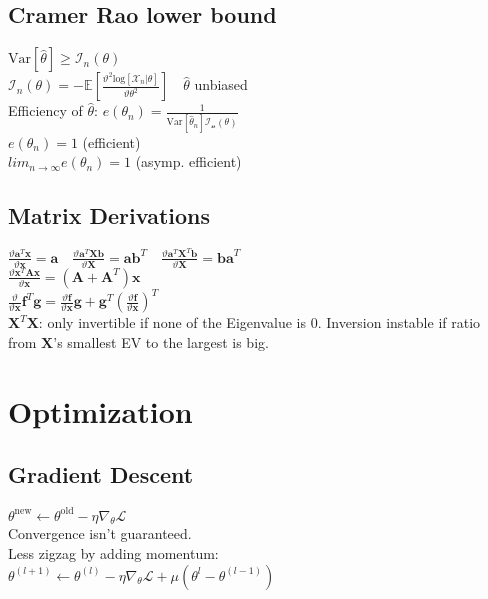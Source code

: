 \subsection*{Cramer Rao lower bound}
$\mathrm{Var}[\hat{\theta}]\geq \mathcal{I}_n(\theta)$\\
$\mathcal{I}_n(\theta) = -\mathbb{E}[\frac{\vartheta^2 \mathrm{log}[\mathcal{X}_n|\theta]}{\vartheta \theta^2}] \quad \hat{\theta}$ unbiased\\
Efficiency of $\hat{\theta}$: $e(\theta_n)=\frac{1}{\mathrm{Var}[\hat{\theta}_n]\mathcal{I_n(\theta)}}$\\
$e(\theta_n) = 1$ (efficient)\\
$lim_{n\rightarrow\infty}e(\theta_n) = 1$ (asymp. efficient)

\subsection*{Matrix Derivations}
$\frac{\vartheta \mathbf{a}^T\mathbf{x}}{\vartheta\mathbf{x}}{=}\mathbf{a} \quad \frac{\vartheta \mathbf{a}^T\mathbf{Xb}}{\vartheta\mathbf{X}}{=}\mathbf{ab}^T \quad \frac{\vartheta \mathbf{a}^T\mathbf{X}^T\mathbf{b}}{\vartheta\mathbf{X}}{=}\mathbf{ba}^T $\\
$\frac{\vartheta \mathbf{x}^T\mathbf{Ax}}{\vartheta\mathbf{x}}{=}(\mathbf{A}+\mathbf{A}^T)\mathbf{x}$\\
$\frac{\vartheta}{\vartheta\mathbf{x}} \mathbf{f}^T\mathbf{g}{=}\frac{\vartheta \mathbf{f}}{\vartheta\mathbf{x}}\mathbf{g}+\mathbf{g}^T\left(\frac{\vartheta\mathbf{f}}{\vartheta\mathbf{x}}\right)^T$\\
$\mathbf{X}^T\mathbf{X}$: only invertible if none of the Eigenvalue is $0$.
Inversion instable if ratio from $\mathbf{X}$'s smallest EV to the largest is big.

\section*{Optimization}
\subsection*{Gradient Descent}
$\theta^{\mathrm{new}}\leftarrow\theta^{\mathrm{old}}-\eta\nabla_{\theta}\mathcal{L}$\\
Convergence isn't guaranteed.\\
Less zigzag by adding momentum: \\$\theta^{(l+1)}\leftarrow\theta^{(l)}-\eta\nabla_{\theta}\mathcal{L}+\mu(\theta^{l}-\theta^{(l-1)})$

